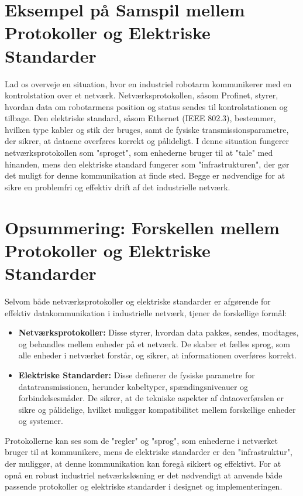 \section{Eksempel på Samspil mellem Protokoller og Elektriske Standarder}
Lad os overveje en situation, hvor en industriel robotarm kommunikerer med en kontrolstation over et netværk. Netværksprotokollen, såsom Profinet, styrer, hvordan data om robotarmens position og status sendes til kontrolstationen og tilbage. Den elektriske standard, såsom Ethernet (IEEE 802.3), bestemmer, hvilken type kabler og stik der bruges, samt de fysiske transmissionsparametre, der sikrer, at dataene overføres korrekt og pålideligt.
\newline\newline\noindent
I denne situation fungerer netværksprotokollen som "sproget", som enhederne bruger til at "tale" med hinanden, mens den elektriske standard fungerer som "infrastrukturen", der gør det muligt for denne kommunikation at finde sted. Begge er nødvendige for at sikre en problemfri og effektiv drift af det industrielle netværk.

\section{Opsummering: Forskellen mellem Protokoller og Elektriske Standarder}
Selvom både netværksprotokoller og elektriske standarder er afgørende for effektiv datakommunikation i industrielle netværk, tjener de forskellige formål:

\begin{itemize}
	\item \textbf{Netværksprotokoller:} Disse styrer, hvordan data pakkes, sendes, modtages, og behandles mellem enheder på et netværk. De skaber et fælles sprog, som alle enheder i netværket forstår, og sikrer, at informationen overføres korrekt.
	
	\item \textbf{Elektriske Standarder:} Disse definerer de fysiske parametre for datatransmissionen, herunder kabeltyper, spændingsniveauer og forbindelsesmåder. De sikrer, at de tekniske aspekter af dataoverførslen er sikre og pålidelige, hvilket muliggør kompatibilitet mellem forskellige enheder og systemer.
\end{itemize}
\noindent Protokollerne kan ses som de "regler" og "sprog", som enhederne i netværket bruger til at kommunikere, mens de elektriske standarder er den "infrastruktur", der muliggør, at denne kommunikation kan foregå sikkert og effektivt. For at opnå en robust industriel netværksløsning er det nødvendigt at anvende både passende protokoller og elektriske standarder i designet og implementeringen.

